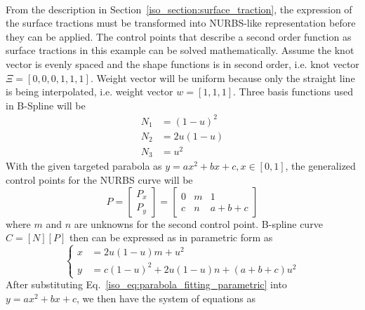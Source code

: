 \paragraph{}
From the description in Section~\ref{iso_section:surface_traction}, the expression of the surface tractions must be transformed into NURBS-like representation before they can be applied.
The control points that describe a second order function as surface tractions in this example can be solved mathematically.
Assume the knot vector is evenly spaced and the shape functions is in second order, i.e. knot vector $\Xi=[0,0,0,1,1,1]$.
Weight vector will be uniform because only the straight line is being interpolated, i.e. weight vector $w=[1,1,1]$.
Three basis functions used in B-Spline will be
    \begin{equation}
    \begin{aligned}
        N_1 & = (1-u)^2 \\
        N_2 & = 2u(1-u) \\
        N_3 & = u^2
    \end{aligned}
    \end{equation}
%
With the given targeted parabola as $y=ax^2+bx+c,x \in [0,1]$, the generalized control points for the NURBS curve will be
    \begin{equation}
        P= \begin{bmatrix}
            P_x \\
            P_y
        \end{bmatrix} = \begin{bmatrix}
            0 & m & 1 \\
            c & n & a+b+c
        \end{bmatrix}
    \end{equation}
%
where $m$ and $n$ are unknowns for the second control point.
B-spline curve $C=[N][P]$ then can be expressed as in parametric form as
    \begin{equation}
        \left\{
        \begin{aligned}
            x &= 2u(1-u)m + u^2 \\
            y &= c(1-u)^2 + 2u(1-u)n + (a+b+c)u^2
        \end{aligned}
        \right.
    \label{iso_eq:parabola_fitting_parametric}
    \end{equation}
%
After substituting Eq.~\ref{iso_eq:parabola_fitting_parametric} into $y=ax^2+bx+c$, we then have the system of equations as
